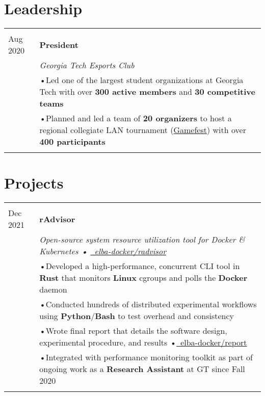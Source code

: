 \documentclass[a4paper,11pt]{article}
\newcommand{\lcolwidth}{2.2cm}
\newcommand{\lcolwidthinner}{2.1cm}
\newcommand{\rcolwidth}{16.2cm}
\newenvironment{rsection}[1]
  {
    \section{#1}
    \begin{tabular}{>{\raggedleft\arraybackslash}p{\lcolwidth}|p{\rcolwidth}}
   } {
    \\\multicolumn{2}{c}{} \\[-10pt]
    \end{tabular}
  }
\newcommand{\rheader}[2]{
    \multirow[t]{2}{*}{
        \begin{minipage}[t]{\lcolwidthinner}
            \begin{flushright}
                \textsc{#1}
            \end{flushright}
        \end{minipage}
    } & \textbf{#2}
}
\newcommand{\rdesc}[1]{
  \\[-2pt]&\small{\emph{#1}\vspace{1pt} }
}
\newcommand{\ritem}[2][ •\hspace{3pt}]{\\[-2pt]& \footnotesize{#1#2}}
\newcommand{\rdot}{\xspace\hspace{0pt}•\hspace{3pt}\xspace}
\begin{document}
\begin{rsection}{Leadership}
  \rheader{July 2019 -\\[-1pt] Aug 2020}{President}
  \rdesc{Georgia Tech Esports Club}
  \ritem{Led one of the largest student organizations at Georgia Tech
    with over \textbf{300 active members} and \textbf{30 competitive teams}}
  \ritem{Planned and led a team of \textbf{20 organizers} to host a regional
    collegiate LAN tournament
    (\href{https://web.archive.org/web/20201111230854/https://gamefest.gg/}{Gamefest})
    with over \textbf{400 participants}}
\end{rsection}
\vspace{-3pt}


\begin{rsection}{Projects}
  \rheader{Feb 2020 -\\[-1pt] Dec 2021}{rAdvisor}
  \rdesc{Open-source system resource utilization tool for Docker \& Kubernetes
    {\normalfont \rdot
    \href{https://github.com/elba-docker/radvisor}{\faGithub\ elba-docker/radvisor}}}
  \ritem{Developed a high-performance, concurrent CLI tool in \textbf{Rust}
    that monitors \textbf{Linux} cgroups and polls the \textbf{Docker} daemon}
  \ritem{Conducted hundreds of distributed experimental workflows
    using \textbf{Python}/\textbf{Bash} to test overhead and consistency}
  \ritem{Wrote final report that details the software design, experimental procedure, and results
    \rdot \href{https://github.com/elba-docker/report}{\faGithub\ elba-docker/report}}
  \ritem{Integrated with performance monitoring toolkit as part of ongoing work
    as a \textbf{Research Assistant} at GT since Fall 2020}
\end{rsection}
\end{document}

